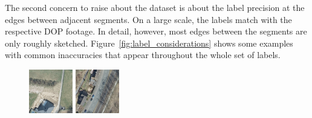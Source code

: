 The second concern to raise about the dataset is about the label precision at the edges between adjacent segments. On a large scale, the labels match with the respective DOP footage. In detail, however, most edges between the segments are only roughly sketched. Figure~\ref{fig:label_considerations} shows some examples with common inaccuracies that appear throughout the whole set of labels.

\begin{figure}[h]
    \newcommand{\LabelConsiderationImageWidth}{0.17\textwidth}
    \centering
    \includegraphics[width=\LabelConsiderationImageWidth]{images/consideration_labels/44883}
    \hspace{1mm}
    \includegraphics[width=\LabelConsiderationImageWidth]{images/consideration_labels/150815}

\end{figure}
